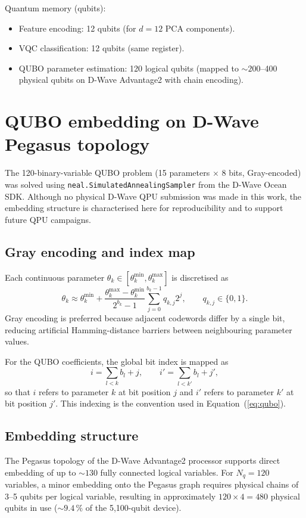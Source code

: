 \documentclass[11pt,a4paper, english]{book}
\theoremstyle{plain}
\theoremstyle{definition}
\numberwithin{equation}{chapter}
\numberwithin{figure}{chapter}
\numberwithin{table}{chapter}
\begin{document}
Quantum memory (qubits):
\begin{itemize}
  \item Feature encoding: 12 qubits (for $d = 12$ PCA components).
  \item VQC classification: 12 qubits (same register).
  \item QUBO parameter estimation: 120 logical qubits (mapped to $\sim 200$--400 
        physical qubits on D-Wave Advantage2 with chain encoding).
\end{itemize}

\chapter{QUBO embedding on D-Wave Pegasus topology}
\label{app:qubo-embedding}

The 120-binary-variable QUBO problem (15 parameters $\times$ 8 bits, 
Gray-encoded) was solved using \texttt{neal.SimulatedAnnealingSampler} 
from the D-Wave Ocean SDK. Although no physical D-Wave QPU submission 
was made in this work, the embedding structure is characterised here 
for reproducibility and to support future QPU campaigns.

\section{Gray encoding and index map}

Each continuous parameter $\theta_k \in [\theta_k^\mathrm{min},\theta_k^\mathrm{max}]$ is discretised as
\[
\theta_k \approx \theta_k^\mathrm{min}
  + \frac{\theta_k^\mathrm{max} - \theta_k^\mathrm{min}}{2^{b_k} - 1}
    \sum_{j=0}^{b_k-1} q_{k,j}2^j,
\qquad q_{k,j}\in\{0,1\}.
\]
Gray encoding is preferred because adjacent codewords differ by a single bit, reducing artificial Hamming-distance barriers between neighbouring parameter values.

For the QUBO coefficients, the global bit index is mapped as
\[
i = \sum_{l<k} b_l + j,
\qquad
i' = \sum_{l<k'} b_l + j',
\]
so that $i$ refers to parameter $k$ at bit position $j$ and $i'$ refers to parameter $k'$ at bit position $j'$. This indexing is the convention used in Equation~(\ref{eq:qubo}).

\section{Embedding structure}
The Pegasus topology of the D-Wave Advantage2 processor supports 
direct embedding of up to $\sim\!130$ fully connected logical variables. 
For $N_q = 120$ variables, a minor embedding onto the Pegasus graph 
requires physical chains of 3--5 qubits per logical variable, resulting 
in approximately $120 \times 4 = 480$ physical qubits in use 
($\sim\!9.4\,\%$ of the 5{,}100-qubit device).
\end{document}
